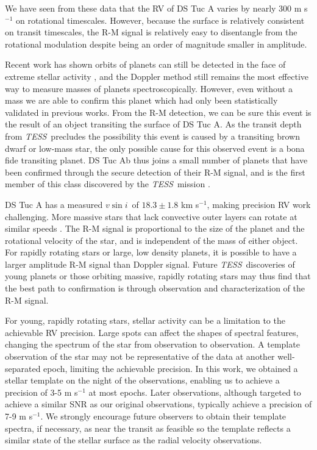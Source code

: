 \documentclass[twocolumn]{aastex63}
\newcommand{\tess}{{\it TESS}}
\newcommand{\vsini}{{$v \sin i$}}
\begin{document}
We have seen from these data that the RV of DS Tuc A varies by nearly 300 m s$^{-1}$ on rotational timescales. 
However, because the surface is relatively consistent on transit timescales, the R-M signal is relatively easy to disentangle from the rotational modulation despite being an order of magnitude smaller in amplitude.

Recent work has shown orbits of planets can still be detected in the face of extreme stellar activity \citep{Barragan19}, and the Doppler method still remains the most effective way to measure masses of planets spectroscopically. 
However, even without a mass we are able to confirm this planet which had only been statistically validated in previous works. 
From the R-M detection, we can be sure this event is the result of an object transiting the surface of DS Tuc A. 
As the transit depth from \tess\ precludes the possibility this event is caused by a transiting brown dwarf or low-mass star, the only possible cause for this observed event is a bona fide transiting planet.
DS Tuc Ab thus joins a small number of planets that have been confirmed through the secure detection of their R-M signal, and is the first member of this class discovered by the \tess\ mission \citep{Jenkins10b, Hirano12b}. 

DS Tuc A has a measured \vsini~of $18.3 \pm 1.8$ km s$^{-1}$, making precision RV work challenging.
More massive stars that lack convective outer layers can rotate at similar speeds \citep[e.g.][]{McQuillan14}. 
The R-M signal is proportional to the size of the planet and the rotational velocity of the star, and is independent of the mass of either object. 
For rapidly rotating stars or large, low density planets, it is possible to have a larger amplitude R-M signal than Doppler signal. 
Future \tess\ discoveries of young planets or those orbiting massive, rapidly rotating stars may thus find that the best path to confirmation is through observation and characterization of the R-M signal.

For young, rapidly rotating stars, stellar activity can be a limitation to the achievable RV precision.
Large spots can affect the shapes of spectral features, changing the spectrum of the star from observation to observation. 
A template observation of the star may not be representative of the data at another well-separated epoch, limiting the achievable precision.
In this work, we obtained a stellar template on the night of the observations, enabling us to achieve a precision of 3-5 m s$^{-1}$ at most epochs. 
Later observations, although targeted to achieve a similar SNR as our original observations, typically achieve a precision of 7-9 m s$^{-1}$. 
We strongly encourage future observers to obtain their template spectra, if necessary, as near the transit as feasible so the template reflects a similar state of the stellar surface as the radial velocity observations.
\end{document}
